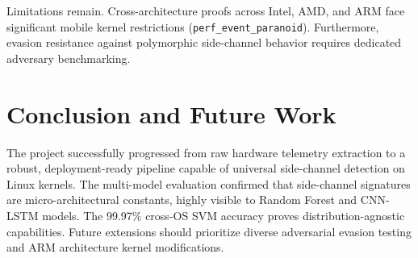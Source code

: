 \documentclass[conference]{IEEEtran}
\begin{document}
Limitations remain. Cross-architecture proofs across Intel, AMD, and ARM face significant mobile kernel restrictions (\texttt{perf\_event\_paranoid}). Furthermore, evasion resistance against polymorphic side-channel behavior requires dedicated adversary benchmarking.

\section{Conclusion and Future Work}
The project successfully progressed from raw hardware telemetry extraction to a robust, deployment-ready pipeline capable of universal side-channel detection on Linux kernels. The multi-model evaluation confirmed that side-channel signatures are micro-architectural constants, highly visible to Random Forest and CNN-LSTM models. The 99.97\% cross-OS SVM accuracy proves distribution-agnostic capabilities. Future extensions should prioritize diverse adversarial evasion testing and ARM architecture kernel modifications.
\end{document}
